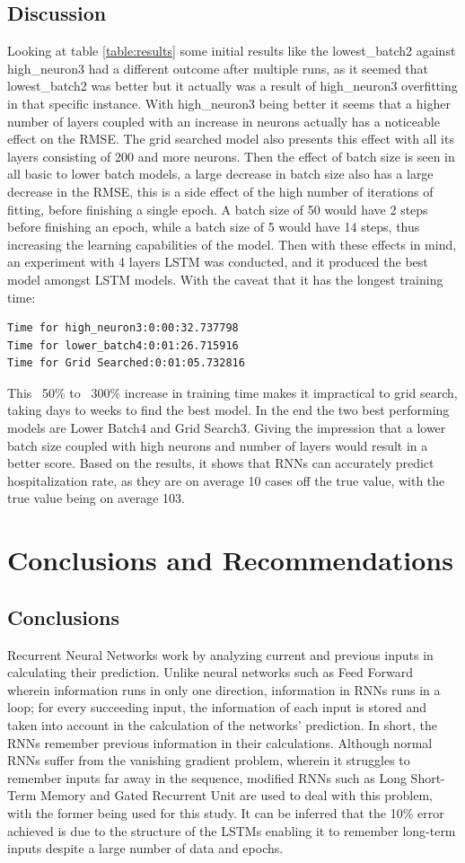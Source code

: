 ﻿\documentclass[10pt,11pt,12pt,oneside]{book}
\begin{document}
\section{Discussion}
    Looking at table \ref{table:results} some initial results like the lowest\_batch2 against high\_neuron3 had a different outcome after multiple runs, as it seemed that lowest\_batch2 was better but it actually was a result of high\_neuron3 overfitting in that specific instance. With high\_neuron3 being better it seems that a higher number of layers coupled with an increase in neurons actually has a noticeable effect on the RMSE. The grid searched model also presents this effect with all its layers consisting of 200 and more neurons. Then the effect of batch size is seen in all basic to lower batch models, a large decrease in batch size also has a large decrease in the RMSE, this is a side effect of the high number of iterations of fitting, before finishing a single epoch. A batch size of 50 would have 2 steps before finishing an epoch, while a batch size of 5 would have 14 steps, thus increasing the learning capabilities of the model. Then with these effects in mind, an experiment with 4 layers LSTM was conducted, and it produced the best model amongst LSTM models. With the caveat that it has the longest training time: \begin{verbatim}
Time for high_neuron3:0:00:32.737798
Time for lower_batch4:0:01:26.715916
Time for Grid Searched:0:01:05.732816
    \end{verbatim}
    This ~50\% to ~300\% increase in training time makes it impractical to grid search, taking days to weeks to find the best model.
    In the end the two best performing models are Lower Batch4 and Grid Search3. Giving the impression that a lower batch size coupled with high neurons and number of layers would result in a better score. Based on the results, it shows that RNNs can accurately predict hospitalization rate, as they are on average 10 cases off the true value, with the true value being on average 103.
\chapter{Conclusions and Recommendations}
\section{Conclusions}
Recurrent Neural Networks work by analyzing current and previous inputs in calculating their prediction. Unlike neural networks such as Feed Forward wherein information runs in only one direction, information in RNNs runs in a loop; for every succeeding input, the information of each input is stored and taken into account in the calculation of the networks' prediction. In short, the RNNs remember previous information in their calculations. Although normal RNNs suffer from the vanishing gradient problem, wherein it struggles to remember inputs far away in the sequence, modified RNNs such as Long Short-Term Memory and Gated Recurrent Unit are used to deal with this problem, with the former being used for this study. It can be inferred that the 10\% error achieved is due to the structure of the LSTMs enabling it to remember long-term inputs despite a large number of data and epochs. 
\end{document}
